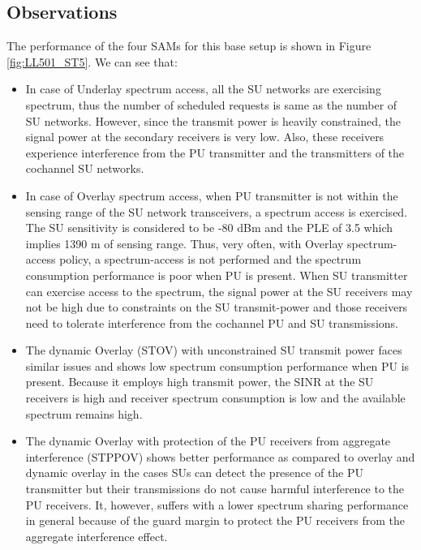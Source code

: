 \documentclass[journal,12pt,draftclsnofoot,onecolumn]{IEEEtran}
\begin{document}
\subsection{Observations}
The performance of the four SAMs for this base setup is shown in Figure \ref{fig:LL501_ST5}. We can see that:
\begin{itemize}
	\item In case of Underlay spectrum access, all the SU networks are exercising spectrum, thus the number of scheduled requests is same as the number of SU networks. However, since the transmit power is heavily constrained,  the signal power at the secondary receivers is very low. Also, these receivers experience interference from the PU transmitter and the transmitters of the cochannel SU networks.
	\item In case of Overlay spectrum access, when PU transmitter is not within the sensing range of the SU network transceivers, a spectrum access is exercised. The SU sensitivity is considered to be -80 dBm and the PLE of 3.5 which implies 1390 m of sensing range. Thus, very often, with Overlay spectrum-access policy, a spectrum-access is not performed and the spectrum consumption performance is poor when PU is present. When SU transmitter can exercise access to the spectrum, the signal power at the SU receivers may not be high due to constraints on the SU transmit-power and those receivers need to tolerate interference from the cochannel PU and SU transmissions.
	\item The dynamic Overlay (STOV) with unconstrained SU transmit power faces similar issues and shows low spectrum consumption performance when PU is present. Because it employs high transmit power, the SINR at the SU receivers is high and receiver spectrum consumption is low and the available spectrum remains high.
	\item The dynamic Overlay with protection of the PU receivers from aggregate interference (STPPOV) shows better performance as compared to overlay and dynamic overlay in the cases SUs can detect the presence of the PU transmitter but their transmissions do not cause harmful interference to the PU receivers. It, however, suffers with a lower spectrum sharing performance in general because of the guard margin to protect the PU receivers from the aggregate interference effect.
\end{itemize}
\end{document}
